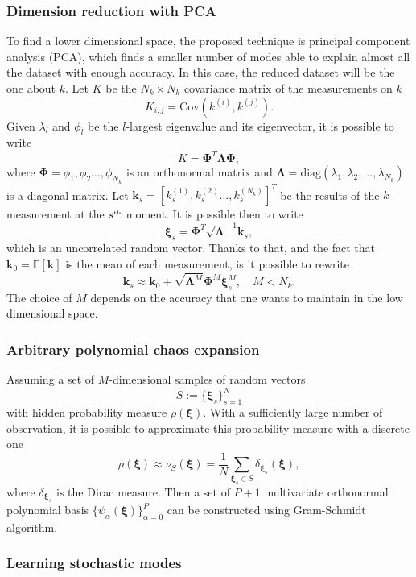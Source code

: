 \documentclass[11pt,a4paper]{article}
\begin{document}
\subsubsection{Dimension reduction with PCA}
To find a lower dimensional space, the proposed technique is principal component analysis (PCA), which finds a smaller number of modes able to explain almost all the dataset with enough accuracy. In this case, the reduced dataset will be the one about \(k\).
Let \(K\) be the \(N_k\times N_k\) covariance matrix of the measurements on \(k\)
\[
   K_{i,j} = \text{Cov}(k^{(i)}, k^{(j)}).
\]
Given \(\lambda_l\) and \(\phi_l\) be the \(l\)-largest eigenvalue and its eigenvector, it is possible to write 
\[
    K = \bm{\Phi}^T\bm{\Lambda}\bm{\Phi},
\]
where \(\bm{\Phi} = \phi_1, \phi_2 \ldots, \phi_{N_k}\) is an orthonormal matrix and \(\bm{\Lambda} = \text{diag}(\lambda_1, \lambda_2, \ldots, \lambda_{N_k})\) is a diagonal matrix. Let \(\bm{k}_s = [k^{(1)}_s, k^{(2)}_s \ldots, k^{(N_k)}_s]^T\) be the results of the \(k\) measurement at the \(s^{\text{\tiny th}}\) moment. It is possible then to write
\[
    \bm{\xi}_s = \bm{\Phi}^T \sqrt{\bm{\Lambda}}^{-1} \bm{k}_s,
\]
which is an uncorrelated random vector. Thanks to that, and the fact that \(\bm{k}_0 = \mathbb{E}[\bm{k}]\) is the mean of each measurement, is it possible to rewrite 
\[
    \bm{k}_s \approx \bm{k}_0 + \sqrt{\bm{\Lambda}^M}\bm{\Phi}^M\bm{\xi}^M_s, \quad M < N_k.
\]
The choice of \(M\) depends on the accuracy that one wants to maintain in the low dimensional space.
\subsubsection{Arbitrary polynomial chaos expansion}
Assuming a set of \(M\)-dimensional samples of random vectors 
\[
    S:= \{\bm{\xi}_s\}_{s=1}^N
\]
with hidden probability measure \(\rho(\bm{\xi})\). With a sufficiently large number of observation, it is possible to approximate this probability measure with a discrete one
\[
    \rho(\bm{\xi}) \approx \nu_S(\bm{\xi}) = \frac{1}{N} \sum_{\bm{\xi}_s \in S} \delta_{\bm{\xi}_s}(\bm{\xi}), 
\]
where \(\delta_{\bm{\xi}_s}\) is the Dirac measure. Then a set of \(P+1\) multivariate orthonormal polynomial basis \(\{\psi_\alpha(\bm{\xi})\}^P_{\alpha=0}\) can be constructed using Gram-Schmidt algorithm. 

\subsubsection{Learning stochastic modes}
\end{document}
